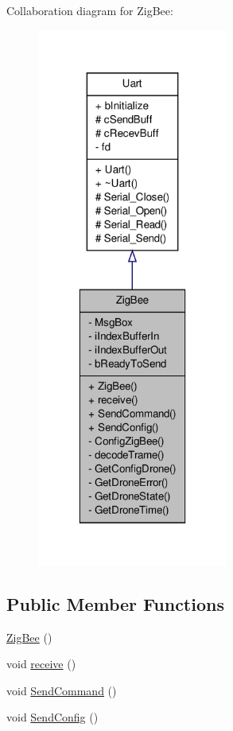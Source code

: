 Collaboration diagram for Zig\-Bee\-:\nopagebreak
\begin{figure}[H]
\begin{center}
\leavevmode
\includegraphics[width=178pt]{classZigBee__coll__graph}
\end{center}
\end{figure}
\subsection*{Public Member Functions}
\begin{DoxyCompactItemize}
\item 
\hyperlink{classZigBee_a488ea980dd12ecd0d02be341f7f6af1b}{Zig\-Bee} ()
\item 
void \hyperlink{classZigBee_a0852f85771d48df17a6256edcd91bece}{receive} ()
\item 
void \hyperlink{classZigBee_a6b69e04be626400b5b245fa1b56f0810}{Send\-Command} ()
\item 
void \hyperlink{classZigBee_aef177ea29c57953e74ddcd8bb356fe2f}{Send\-Config} ()
\end{DoxyCompactItemize}

